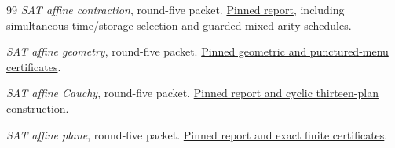 \begin{thebibliography}{99}
\emph{SAT affine contraction}, round-five packet.
\href{https://github.com/VladimirReshetnikov/ProveIt/blob/324f3d9b009ab0323f33be65cd6577867c9c4338/Computability/SubexponentialSAT/Research/sat_affine_contraction/report.tex}{Pinned report}, including simultaneous time/storage selection and guarded mixed-arity schedules.

\emph{SAT affine geometry}, round-five packet.
\href{https://github.com/VladimirReshetnikov/ProveIt/blob/324f3d9b009ab0323f33be65cd6577867c9c4338/Computability/SubexponentialSAT/Research/sat_affine_geometry/review/geometry.tex}{Pinned geometric and punctured-menu certificates}.

\emph{SAT affine Cauchy}, round-five packet.
\href{https://github.com/VladimirReshetnikov/ProveIt/tree/324f3d9b009ab0323f33be65cd6577867c9c4338/Computability/SubexponentialSAT/Research/sat_affine_cauchy}{Pinned report and cyclic thirteen-plan construction}.

\emph{SAT affine plane}, round-five packet.
\href{https://github.com/VladimirReshetnikov/ProveIt/tree/324f3d9b009ab0323f33be65cd6577867c9c4338/Computability/SubexponentialSAT/Research/sat_affine_plane}{Pinned report and exact finite certificates}.
\end{thebibliography}
